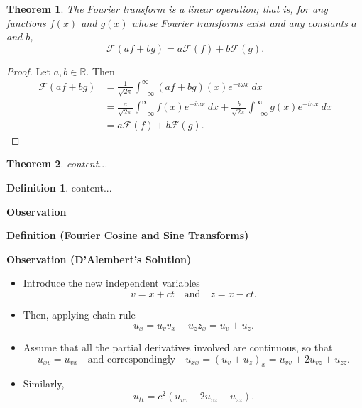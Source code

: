 \documentclass[12pt,openany]{book}
\newtheorem{theorem}{Theorem}[chapter]
\theoremstyle{definition}
\newtheorem{definition}{Definition}[chapter]
\newcommand{\R}{\mathbb{R}}
\begin{document}
	\vspace{12pt}
	\begin{tcolorbox}[colframe=thmcolor, title={\color{white}\bf Linearity of the Fourier Transform}]
		\begin{theorem}
			The Fourier transform is a linear operation; that is, for any functions \( f(x) \) and \( g(x) \)
			whose Fourier transforms exist and any constants \( a \) and \( b \),
			\[ \mathcal{F}(af + bg) = a\mathcal{F}(f) + b\mathcal{F}(g). \]
		\end{theorem}
	\end{tcolorbox}
	\begin{proof}
		Let $a,b\in\R$. Then \begin{align*}
			\mathcal{F}(af+bg)&=\frac{1}{\sqrt{2\pi}} \int_{-\infty}^{\infty} (af+bg)(x)e^{-i\omega x}\ dx\\
			&=\frac{a}{\sqrt{2\pi}} \int_{-\infty}^{\infty} f(x)e^{-i\omega x}\ dx+\frac{b}{\sqrt{2\pi}} \int_{-\infty}^{\infty} g(x)e^{-i\omega x}\ dx\\
			&=a\mathcal{F}(f) + b\mathcal{F}(g).
		\end{align*}
	\end{proof}
	\newpage
	\begin{tcolorbox}[colframe=thmcolor, title={\color{white}\bf Fourier Cosine and Since Series}]
		\begin{theorem}
			content...
		\end{theorem}
	\end{tcolorbox}
	\begin{tcolorbox}[colframe=defcolor, title={\color{white}\bf Fourier Cosine and Since Series}]
		\begin{definition}
			content...
		\end{definition}
	\end{tcolorbox}
	\textbf{Observation}
	
	
	
	\textbf{Definition (Fourier Cosine and Sine Transforms)}
	
	
	
	
	
	\newpage
	
	\textbf{Observation (D'Alembert's Solution)}
	
	\begin{itemize}
		\item Introduce the new independent variables
		\[
		v = x + ct \quad \text{and} \quad z = x - ct.
		\]
		\item Then, applying chain rule
		\[
		u_x = u_v v_x + u_z z_x = u_v + u_z.
		\]
		\item Assume that all the partial derivatives involved are continuous, so that
		\[
		u_{xv} = u_{vx} \quad \text{and correspondingly} \quad u_{xx} = (u_v + u_z)_x = u_{vv} + 2u_{vz} + u_{zz}.
		\]
		\item Similarly,
		\[
		u_{tt} = c^2 (u_{vv} - 2u_{vz} + u_{zz}).
		\]
	\end{itemize}
	
\end{document}
